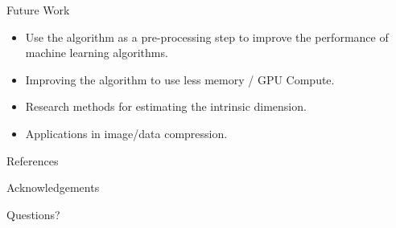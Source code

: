 \documentclass{beamer}
\begin{document}
\begin{frame}{Future Work}
    \begin{block}{}
    \begin{itemize}[<+->]
        \setlength\itemsep{1em}
        \item Use the algorithm as a pre-processing step to improve the performance of machine learning algorithms.
        \item Improving the algorithm to use less memory / GPU Compute.
        \item Research methods for estimating the intrinsic dimension.
        \item Applications in image/data compression.
    \end{itemize}
    \end{block}
\end{frame}

\begin{frame}[allowframebreaks]{References}
    \fontsize{6}{12}\selectfont
\end{frame}

\begin{frame}{Acknowledgements}
    \fontsize{6}{10}
    \vspace*{1cm}
    \fontsize{6}{12}
\end{frame}

\begin{frame}{Questions?}
\end{frame}
\end{document}
